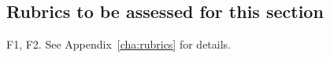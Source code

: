 %	

\subsection{Rubrics to be assessed for this section}

F1, F2. See Appendix~\ref{cha:rubrics} for details.





